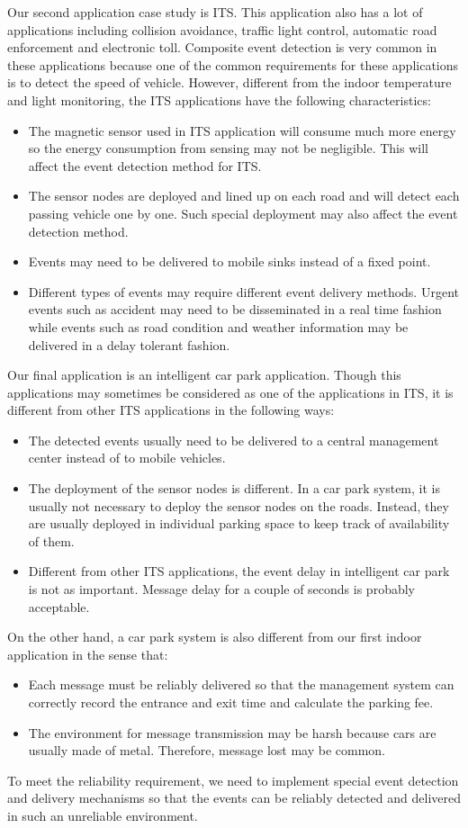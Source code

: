 Our second application case study is ITS. This application also has a lot of applications including collision avoidance, traffic light control, automatic road enforcement and electronic toll. Composite event detection is very common in these applications because one of the common requirements for these applications is to detect the speed of vehicle. However, different from the indoor temperature and light monitoring, the ITS applications have the following characteristics:
\begin{itemize}
\item The magnetic sensor used in ITS application will consume much more energy so the energy consumption from sensing may not be negligible. This will affect the event detection method for ITS.
\item The sensor nodes are deployed and lined up on each road and will detect each passing vehicle one by one. Such special deployment may also affect the event detection method.
\item Events may need to be delivered to mobile sinks instead of a fixed point.
\item Different types of events may require different event delivery methods. Urgent events such as accident may need to be disseminated in a real time fashion while events such as road condition and weather information may be delivered in a delay tolerant fashion.
\end{itemize}

Our final application is an intelligent car park application. Though this applications may sometimes be considered as one of the applications in ITS, it is different from other ITS applications in the following ways:
\begin{itemize}
\item The detected events usually need to be delivered to a central management center instead of to mobile vehicles.
\item The deployment of the sensor nodes is different. In a car park system, it is usually not necessary to deploy the sensor nodes on the roads. Instead, they are usually deployed in individual parking space to keep track of availability of them.
\item Different from other ITS applications, the event delay in intelligent car park is not as important. Message delay for a couple of seconds is probably acceptable.
\end{itemize}

On the other hand, a car park system is also different from our first indoor application in the sense that:
\begin{itemize}
\item Each message must be reliably delivered so that the management system can correctly record the entrance and exit time and calculate the parking fee.
\item The environment for message transmission may be harsh because cars are usually made of metal. Therefore, message lost may be common.
\end{itemize}
To meet the reliability requirement, we need to implement special event detection and delivery mechanisms so that the events can be reliably detected and delivered in such an unreliable environment.

